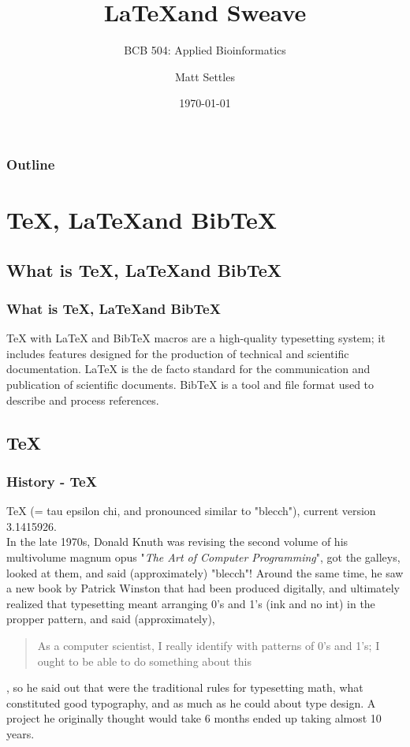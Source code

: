 \documentclass[pdf]{beamer}
\begin{document}
\title[\LaTeX and Sweave]{\LaTeX and Sweave}
\subtitle{BCB 504: Applied Bioinformatics\\}
\author[Matt Settles]{Matt Settles}
\date{\today}


\begin{frame}[plain]
  \titlepage
\end{frame}


\begin{frame}[plain] 
  \frametitle{Outline}
  \tableofcontents
\end{frame}

\section{\TeX{}, \LaTeX and BibTeX}
\subsection{What is \TeX{}, \LaTeX and BibTeX}
\begin{frame}
  \frametitle{What is \TeX{}, \LaTeX and BibTeX}
\TeX{} with \LaTeX{} and BibTeX macros are a high-quality typesetting system; it includes features designed for the production of technical and scientific documentation. \LaTeX{} is the de facto standard for the communication and publication of scientific documents. BibTeX is a tool and file format used to describe and process references.
\end{frame}

\subsection{\TeX}
\begin{frame}
\frametitle{History - \TeX}
  \TeX{} (= tau epsilon chi, and pronounced similar to "blecch"), current version 3.1415926.\\  
\vspace{1cm}
  In the late 1970s, Donald Knuth was revising the second volume of his multivolume magnum opus "\textit{The Art of Computer Programming}", got the galleys, looked at them, and said (approximately) "blecch"! Around the same time, he saw a new book by Patrick Winston that had been produced digitally, and ultimately realized that typesetting meant arranging 0's and 1's (ink and no int) in the propper pattern, and said (approximately), 
\begin{quote}
As a computer scientist, I really identify with patterns of 0's and 	1's; I ought to be able to do something about this
\end{quote}
, so he said out that were the traditional rules for typesetting math, what constituted good typography, and as much as he could about type design. A project he originally thought would take 6 months ended up taking almost 10 years.
\end{frame}
\end{document}
